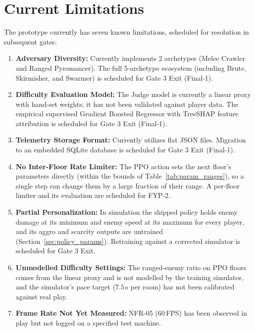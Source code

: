\section{Current Limitations}
\label{sec:limitations}
The prototype currently has seven known limitations, scheduled for resolution in subsequent gates:
\begin{enumerate}
    \item \textbf{Adversary Diversity:} Currently implements 2 archetypes (Melee Crawler and Ranged Pyromancer). The full 5-archetype ecosystem (including Brute, Skirmisher, and Swarmer) is scheduled for Gate 3 Exit (Final-1).
    \item \textbf{Difficulty Evaluation Model:} The Judge model is currently a linear proxy with hand-set weights; it has not been validated against player data. The empirical supervised Gradient Boosted Regressor with TreeSHAP feature attribution is scheduled for Gate 3 Exit (Final-1).
    \item \textbf{Telemetry Storage Format:} Currently utilizes flat JSON files. Migration to an embedded SQLite database is scheduled for Gate 3 Exit (Final-1).
    \item \textbf{No Inter-Floor Rate Limiter:} The PPO action sets the next floor's parameters directly (within the bounds of Table~\ref{tab:param_ranges}), so a single step can change them by a large fraction of their range. A per-floor limiter and its evaluation are scheduled for FYP-2.
    \item \textbf{Partial Personalization:} In simulation the shipped policy holds enemy damage at its minimum and enemy speed at its maximum for every player, and its aggro and scarcity outputs are untrained (Section~\ref{sec:policy_params}). Retraining against a corrected simulator is scheduled for Gate 3 Exit.
    \item \textbf{Unmodelled Difficulty Settings:} The ranged-enemy ratio on PPO floors comes from the linear proxy and is not modelled by the training simulator, and the simulator's pace target ($7.5$\,s per room) has not been calibrated against real play.
    \item \textbf{Frame Rate Not Yet Measured:} NFR-05 (60\,FPS) has been observed in play but not logged on a specified test machine.
\end{enumerate}
